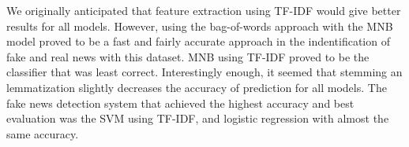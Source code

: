 \documentclass{neu_handout}
\begin{document}
We originally anticipated that feature extraction using TF-IDF would give better results for all models. However, using the bag-of-words approach with the MNB model proved to be a fast and fairly accurate approach in the indentification of fake and real news with this dataset. MNB using TF-IDF proved to be the classifier that was least correct. Interestingly enough, it seemed that stemming an lemmatization slightly decreases the accuracy of prediction for all models. The fake news detection system that achieved the highest accuracy and best evaluation was the SVM using TF-IDF, and logistic regression with almost the same accuracy.

\begin{figure}[h]
\centering
{}
\end{figure}
\end{document}
